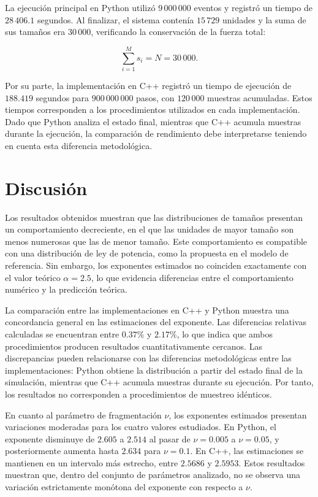 \documentclass[
a4paper,
amsfonts,
amssymb,
amsmath,
reprint,
twoside
]{revtex4-1}
\begin{document}
La ejecución principal en Python utilizó $9\,000\,000$ eventos
y registró un tiempo de $28\,406.1$ segundos. Al finalizar,
el sistema contenía $15\,729$ unidades y la suma de sus tamaños
era $30\,000$, verificando la conservación de la fuerza total:

\begin{equation}
    \sum_{i=1}^{M}s_i=N=30\,000.
\end{equation}

Por su parte, la implementación en C++ registró un tiempo de
ejecución de $188.419$ segundos para $900\,000\,000$ pasos,
con $120\,000$ muestras acumuladas. Estos tiempos corresponden
a los procedimientos utilizados en cada implementación. Dado
que Python analiza el estado final, mientras que C++ acumula
muestras durante la ejecución, la comparación de rendimiento
debe interpretarse teniendo en cuenta esta diferencia
metodológica.

\section{Discusión}

Los resultados obtenidos muestran que las distribuciones de
tamaños presentan un comportamiento decreciente, en el que las
unidades de mayor tamaño son menos numerosas que las de menor
tamaño. Este comportamiento es compatible con una distribución
de ley de potencia, como la propuesta en el modelo de referencia.
Sin embargo, los exponentes estimados no coinciden exactamente
con el valor teórico $\alpha=2.5$, lo que evidencia diferencias
entre el comportamiento numérico y la predicción teórica.

La comparación entre las implementaciones en C++ y Python muestra
una concordancia general en las estimaciones del exponente.
Las diferencias relativas calculadas se encuentran entre
$0.37\%$ y $2.17\%$, lo que indica que ambos procedimientos
producen resultados cuantitativamente cercanos. Las discrepancias
pueden relacionarse con las diferencias metodológicas entre las
implementaciones: Python obtiene la distribución a partir del
estado final de la simulación, mientras que C++ acumula muestras
durante su ejecución. Por tanto, los resultados no corresponden
a procedimientos de muestreo idénticos.

En cuanto al parámetro de fragmentación $\nu$, los exponentes
estimados presentan variaciones moderadas para los cuatro valores
estudiados. En Python, el exponente disminuye de $2.605$ a
$2.514$ al pasar de $\nu=0.005$ a $\nu=0.05$, y posteriormente
aumenta hasta $2.634$ para $\nu=0.1$. En C++, las estimaciones
se mantienen en un intervalo más estrecho, entre $2.5686$ y
$2.5953$. Estos resultados muestran que, dentro del conjunto
de parámetros analizado, no se observa una variación estrictamente
monótona del exponente con respecto a $\nu$.
\end{document}
